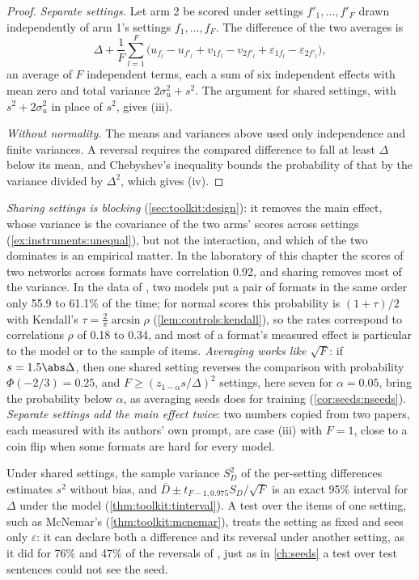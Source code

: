 \begin{refsection}
\begin{proof}
\emph{Separate settings.} Let arm 2 be scored under settings $f'_1,\dots,f'_F$ drawn independently of arm 1's settings $f_1,\dots,f_F$. The difference of the two averages is
\[
\Delta+\frac1F\sum_{l=1}^F\bigl(u_{f_l}-u_{f'_l}+v_{1f_l}-v_{2f'_l}+\varepsilon_{1f_l}-\varepsilon_{2f'_l}\bigr),
\]
an average of $F$ independent terms, each a sum of six independent effects with mean zero and total variance $2\sigma_u^2+s^2$. The argument for shared settings, with $s^2+2\sigma_u^2$ in place of $s^2$, gives (iii).

\emph{Without normality.} The means and variances above used only independence and finite variances. A reversal requires the compared difference to fall at least $\Delta$ below its mean, and Chebyshev's inequality bounds the probability of that by the variance divided by $\Delta^2$, which gives (iv).
\end{proof}

\emph{Sharing settings is blocking} (\cref{sec:toolkit:design}): it removes the main effect, whose variance is the covariance of the two arms' scores across settings (\cref{ex:instruments:unequal}), but not the interaction, and which of the two dominates is an empirical matter. In the laboratory of this chapter the scores of two networks across formats have correlation 0.92, and sharing removes most of the variance. In the data of \textcite{SclarEtAl2024}, two models put a pair of formats in the same order only 55.9 to 61.1\% of the time; for normal scores this probability is $(1+\tau)/2$ with Kendall's $\tau=\frac2\pi\arcsin\rho$ (\cref{lem:controls:kendall}), so the rates correspond to correlations $\rho$ of 0.18 to 0.34, and most of a format's measured effect is particular to the model or to the sample of items. \emph{Averaging works like $\sqrt F$}: if $s=1.5\abs\Delta$, then one shared setting reverses the comparison with probability $\Phi(-2/3)=0.25$, and $F\ge(z_{1-\alpha}s/\Delta)^2$ settings, here seven for $\alpha=0.05$, bring the probability below $\alpha$, as averaging seeds does for training (\cref{cor:seeds:nseeds}). \emph{Separate settings add the main effect twice}: two numbers copied from two papers, each measured with its authors' own prompt, are case (iii) with $F=1$, close to a coin flip when some formats are hard for every model.

Under shared settings, the sample variance $S_D^2$ of the per-setting differences estimates $s^2$ without bias, and $\bar D\pm t_{F-1,0.975}S_D/\sqrt F$ is an exact 95\% interval for $\Delta$ under the model (\cref{thm:toolkit:tinterval}). A test over the items of one setting, such as McNemar's (\cref{thm:toolkit:mcnemar}), treats the setting as fixed and sees only $\varepsilon$: it can declare both a difference and its reversal under another setting, as it did for 76\% and 47\% of the reversals of \textcite{SclarEtAl2024}, just as in \cref{ch:seeds} a test over test sentences could not see the seed.


\end{refsection}
